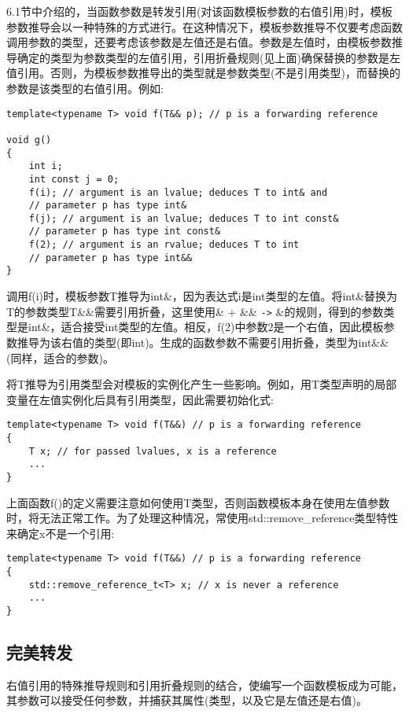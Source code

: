 6.1节中介绍的，当函数参数是转发引用(对该函数模板参数的右值引用)时，模板参数推导会以一种特殊的方式进行。在这种情况下，模板参数推导不仅要考虑函数调用参数的类型，还要考虑该参数是左值还是右值。参数是左值时，由模板参数推导确定的类型为参数类型的左值引用，引用折叠规则(见上面)确保替换的参数是左值引用。否则，为模板参数推导出的类型就是参数类型(不是引用类型)，而替换的参数是该类型的右值引用。例如:

\begin{lstlisting}[style=styleCXX]
template<typename T> void f(T&& p); // p is a forwarding reference

void g()
{
	int i;
	int const j = 0;
	f(i); // argument is an lvalue; deduces T to int& and
	// parameter p has type int&
	f(j); // argument is an lvalue; deduces T to int const&
	// parameter p has type int const&
	f(2); // argument is an rvalue; deduces T to int
	// parameter p has type int&&
}
\end{lstlisting}

调用f(i)时，模板参数T推导为int\&，因为表达式i是int类型的左值。将int\&替换为T的参数类型T\&\&需要引用折叠，这里使用\& + \&\& \texttt{->} \&的规则，得到的参数类型是int\&，适合接受int类型的左值。相反，f(2)中参数2是一个右值，因此模板参数推导为该右值的类型(即int)。生成的函数参数不需要引用折叠，类型为int\&\&(同样，适合的参数)。

将T推导为引用类型会对模板的实例化产生一些影响。例如，用T类型声明的局部变量在左值实例化后具有引用类型，因此需要初始化式:

\begin{lstlisting}[style=styleCXX]
template<typename T> void f(T&&) // p is a forwarding reference
{
	T x; // for passed lvalues, x is a reference
	...
}
\end{lstlisting}

上面函数f()的定义需要注意如何使用T类型，否则函数模板本身在使用左值参数时，将无法正常工作。为了处理这种情况，常使用std::remove\_reference类型特性来确定x不是一个引用:

\begin{lstlisting}[style=styleCXX]
template<typename T> void f(T&&) // p is a forwarding reference
{
	std::remove_reference_t<T> x; // x is never a reference
	...
}
\end{lstlisting}


\subsection{完美转发}

右值引用的特殊推导规则和引用折叠规则的结合，使编写一个函数模板成为可能，其参数可以接受任何参数，并捕获其属性(类型，以及它是左值还是右值)。


